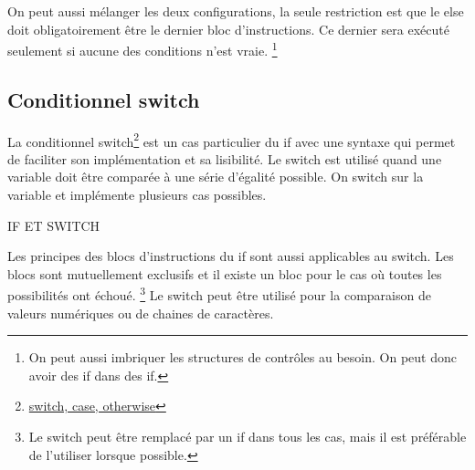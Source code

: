 \documentclass{tufte-handout}
\begin{document}
On peut aussi mélanger les deux configurations, la seule restriction est que le else doit obligatoirement être le dernier bloc d'instructions. Ce dernier sera exécuté seulement si aucune des conditions n'est vraie.
\footnote{On peut aussi imbriquer les structures de contrôles au besoin. On peut donc avoir des if dans des if.}

\subsection{Conditionnel switch}
La conditionnel switch\footnote{\href{https://www.mathworks.com/help/matlab/ref/switch.html}{switch, case, otherwise}} est un cas particulier du if avec une syntaxe qui permet de faciliter son implémentation et sa lisibilité.
Le switch est utilisé quand une variable doit être comparée à une série d'égalité possible. On switch sur la variable et implémente plusieurs cas possibles.

IF ET SWITCH

Les principes des blocs d'instructions du if sont aussi applicables au switch. Les blocs sont mutuellement exclusifs et il existe un bloc pour le cas où toutes les possibilités ont échoué.
\footnote{Le switch peut être remplacé par un if dans tous les cas, mais il est préférable de l'utiliser lorsque possible.}
Le switch peut être utilisé pour la comparaison de valeurs numériques ou de chaines de caractères.


\end{document}

